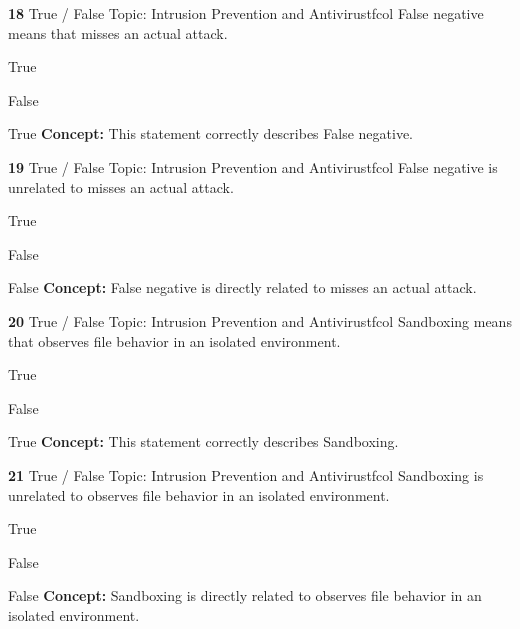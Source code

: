 \documentclass[10pt,a4paper]{article}
\begin{document}
\begin{qcard}{\color{white}\textbf{18} \hfill \small True / False \textbar{} Topic: Intrusion Prevention and Antivirus}{tfcol}
False negative means that misses an actual attack.

\begin{qoptions}
\item True
\item False
\end{qoptions}
\begin{explainbox}{True}
\textbf{Concept:} This statement correctly describes False negative.
\end{explainbox}
\end{qcard}

\begin{qcard}{\color{white}\textbf{19} \hfill \small True / False \textbar{} Topic: Intrusion Prevention and Antivirus}{tfcol}
False negative is unrelated to misses an actual attack.

\begin{qoptions}
\item True
\item False
\end{qoptions}
\begin{explainbox}{False}
\textbf{Concept:} False negative is directly related to misses an actual attack.
\end{explainbox}
\end{qcard}

\begin{qcard}{\color{white}\textbf{20} \hfill \small True / False \textbar{} Topic: Intrusion Prevention and Antivirus}{tfcol}
Sandboxing means that observes file behavior in an isolated environment.

\begin{qoptions}
\item True
\item False
\end{qoptions}
\begin{explainbox}{True}
\textbf{Concept:} This statement correctly describes Sandboxing.
\end{explainbox}
\end{qcard}

\begin{qcard}{\color{white}\textbf{21} \hfill \small True / False \textbar{} Topic: Intrusion Prevention and Antivirus}{tfcol}
Sandboxing is unrelated to observes file behavior in an isolated environment.

\begin{qoptions}
\item True
\item False
\end{qoptions}
\begin{explainbox}{False}
\textbf{Concept:} Sandboxing is directly related to observes file behavior in an isolated environment.
\end{explainbox}
\end{qcard}
\end{document}
